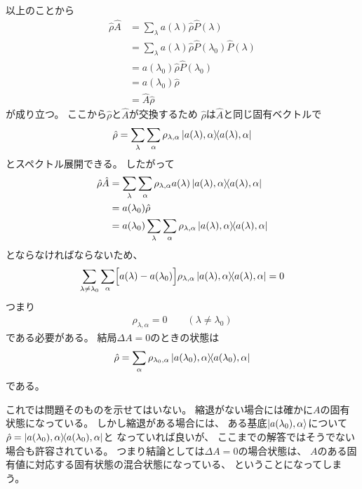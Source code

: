 \documentclass[a4paper, 10pt, uplatex]{jsarticle}
\begin{document}
\begin{problem}[label=pr:3]
	以上のことから
	\begin{align}
		\hat{\rho} \hat{A}
		&= \sum_\lambda a(\lambda) \hat{\rho} \hat{P}(\lambda) \\
		&= \sum_\lambda a(\lambda) \hat{\rho} \hat{P}(\lambda_0)
		\hat{P}(\lambda) \\
		&= a(\lambda_0) \hat{\rho} \hat{P}(\lambda_0) \\
		&= a(\lambda_0) \hat{\rho} \\
		&=\hat{A} \hat{\rho}
	\end{align}
	が成り立つ。
	ここから$\hat{\rho}$と$\hat{A}$が交換するため
	$\hat{\rho}$は$\hat{A}$と同じ固有ベクトルで
	\begin{align}
		\hat{\rho} = \sum_\lambda \sum_\alpha \rho_{\lambda, \alpha}
		\Ket{a(\lambda), \alpha} \! \! \Bra{a(\lambda), \alpha}
	\end{align}
	とスペクトル展開できる。
	したがって
	\begin{align}
		\hat{\rho} \hat{A}
		&= \sum_\lambda \sum_\alpha \rho_{\lambda, \alpha} a(\lambda)
		\Ket{a(\lambda), \alpha} \! \! \Bra{a(\lambda), \alpha} \\
		&= a(\lambda_0) \hat{\rho} \\
		&= a(\lambda_0) \sum_\lambda \sum_\alpha \rho_{\lambda, \alpha}
		\Ket{a(\lambda), \alpha} \! \! \Bra{a(\lambda), \alpha}
	\end{align}
	とならなければならないため、
	\begin{align}
		\sum_{\lambda \neq \lambda_0} \sum_\alpha
		\Bigl[ a(\lambda) - a(\lambda_0) \Bigr] \rho_{\lambda, \alpha}
		\Ket{a(\lambda),\alpha} \! \! \Bra{a(\lambda),\alpha}
		= 0
	\end{align}
	つまり
	\begin{align}
		\rho_{\lambda, \alpha} = 0 \qquad
		\left( \lambda \neq \lambda_0 \right)
	\end{align}
	である必要がある。
	結局$\Delta A = 0$のときの状態は
	\begin{align}
		\hat{\rho}
		= \sum_\alpha \rho_{\lambda_0, \alpha}
		\Ket{a(\lambda_0), \alpha} \! \! \Bra{a(\lambda_0), \alpha}
	\end{align}
	である。

	これでは問題そのものを示せてはいない。
	縮退がない場合には確かに$A$の固有状態になっている。
	しかし縮退がある場合には、
	ある基底$\Ket{a(\lambda_0), \alpha}$について
	$\hat{\rho} = \Ket{a(\lambda_0), \alpha} \! \! \Bra{a(\lambda_0), \alpha}$と
	なっていれば良いが、
	ここまでの解答ではそうでない場合も許容されている。
	つまり結論としては$\Delta A = 0$の場合状態は、
	$A$のある固有値に対応する固有状態の混合状態になっている、
	ということになってしまう。
	\footnotemark
\end{problem}
\end{document}
